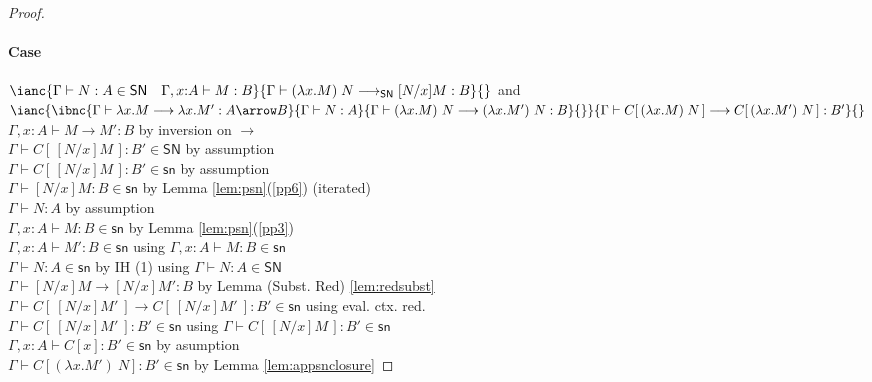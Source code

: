 \documentclass{article}
\newcommand{\SN}{\mathsf{SN}}
\newcommand{\csn}{\mathsf{sn}}
\newcommand{\red}{\longrightarrow}
\newcommand{\redSN}{\longrightarrow_\SN}
\begin{document}
\begin{proof}
\paragraph{Case} $\ianc{\Gamma \vdash N : A \in \SN \quad \Gamma, x{:}A \vdash M : B}
                       {\Gamma \vdash (\lambda x.M)\;N \redSN [N/x]M : B}{}$
\qquad and \qquad$
             \ianc{
                   \ibnc{\Gamma \vdash \lambda x.M \red \lambda x.M' : A \arrow B}
                        {\Gamma \vdash N : A}
                        {\Gamma \vdash (\lambda x.M)~N \red (\lambda x.M')~N : B}{}}
                     {\Gamma \vdash C[\,(\lambda x.M)\;N\,] \red C[\, (\lambda x.M')~N \,] : B'}{}
                  $
\\[1em]
$\Gamma, x:A \vdash M \red M' : B$ \hfill by inversion on $\red$\\
$\Gamma \vdash C[\,[N/x]M\,] : B' \in \SN$ \hfill by assumption \\
$\Gamma \vdash C[\,[N/x]M\,] : B' \in \csn$ \hfill by assumption \\
$\Gamma \vdash [N/x]M : B \in \csn$ \hfill by Lemma \ref{lem:psn}(\ref{pp6}) (iterated)\\
$\Gamma \vdash N : A$ \hfill by assumption \\
$\Gamma,x{:}A \vdash M : B \in \csn$ \hfill by Lemma \ref{lem:psn}(\ref{pp3}) \\
$\Gamma, x{:}A \vdash M' : B \in \csn$ \hfill using $\Gamma,x{:}A \vdash M : B \in \csn$ \\
$\Gamma \vdash N : A \in \csn$ \hfill by IH (1) using $\Gamma \vdash N : A \in \SN$\\
$\Gamma \vdash [N/x]M \red [N/x]M' : B$ \hfill by Lemma (Subst. Red) \ref{lem:redsubst}\\
$\Gamma \vdash C[~[N/x]M'~]  \red C[~[N/x]M'~] : B' \in \csn$ \hfill using eval. ctx. red.\\
$\Gamma \vdash C[~[N/x]M'~]: B' \in \csn $ \hfill using $\Gamma \vdash C[\,[N/x]M\,] : B' \in \csn$\\
$\Gamma, x{:}A \vdash C[x] : B' \in \csn$ \hfill by asumption \\
$\Gamma \vdash C[(\lambda x.M')~N] : B' \in \csn$ \hfill by Lemma \ref{lem:appsnclosure}


\end{proof}
\end{document}

